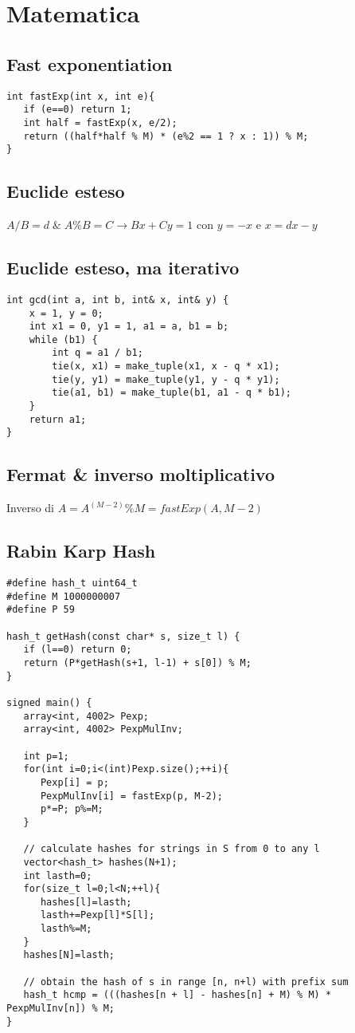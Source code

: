 \section{Matematica}

\subsection{Fast exponentiation}
\begin{lstlisting}
int fastExp(int x, int e){
   if (e==0) return 1;
   int half = fastExp(x, e/2);
   return ((half*half % M) * (e%2 == 1 ? x : 1)) % M;
}
\end{lstlisting}

\subsection{Euclide esteso}
$A/B=d\; \& \;A\%B=C \rightarrow Bx+Cy = 1$ con $y=-x$ e $x = dx - y$

\subsection{Euclide esteso, ma iterativo}
\begin{lstlisting}
int gcd(int a, int b, int& x, int& y) {
    x = 1, y = 0;
    int x1 = 0, y1 = 1, a1 = a, b1 = b;
    while (b1) {
        int q = a1 / b1;
        tie(x, x1) = make_tuple(x1, x - q * x1);
        tie(y, y1) = make_tuple(y1, y - q * y1);
        tie(a1, b1) = make_tuple(b1, a1 - q * b1);
    }
    return a1;
}
\end{lstlisting}

\subsection{Fermat \& inverso moltiplicativo}
Inverso di $A = A^{(M-2)}\%M = fastExp(A, M-2)$

\subsection{Rabin Karp Hash}
\begin{lstlisting}
#define hash_t uint64_t
#define M 1000000007
#define P 59

hash_t getHash(const char* s, size_t l) {
   if (l==0) return 0;
   return (P*getHash(s+1, l-1) + s[0]) % M;
}

signed main() {
   array<int, 4002> Pexp;
   array<int, 4002> PexpMulInv;

   int p=1;
   for(int i=0;i<(int)Pexp.size();++i){
      Pexp[i] = p;
      PexpMulInv[i] = fastExp(p, M-2);
      p*=P; p%=M;
   }
   
   // calculate hashes for strings in S from 0 to any l
   vector<hash_t> hashes(N+1);
   int lasth=0;
   for(size_t l=0;l<N;++l){
      hashes[l]=lasth;
      lasth+=Pexp[l]*S[l];
      lasth%=M;
   }
   hashes[N]=lasth;

   // obtain the hash of s in range [n, n+l) with prefix sum
   hash_t hcmp = (((hashes[n + l] - hashes[n] + M) % M) * PexpMulInv[n]) % M;
}
\end{lstlisting}

